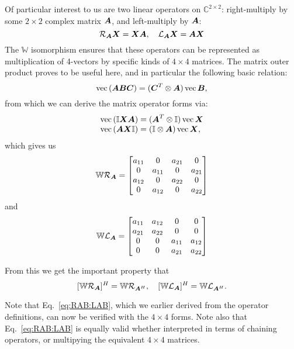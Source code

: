 \documentclass[useAMS,usenatbib]{mn2e}
\makeatletter
\newcommand{\COMPLEX}{\mathbb{C}}
\newcommand{\II}{\mathbb{I}}
\newcommand{\mat}[1]{{\bmath{#1}}}
\newcommand{\Matrix}[2]{\left [ \begin{array}{@{}#1@{}}#2\end{array} \right ]}
\newcommand{\Rop}[1]{\mathcal{R}_{{#1}}}
\newcommand{\Lop}[1]{\mathcal{L}_{{#1}}}
\numberwithin{equation}{section}
\makeatother
\begin{document}
Of particular interest to us are two linear operators on $\COMPLEX^{2\times2}$: 
right-multiply by some $2\times2$ complex matrix $\mat{A}$,  and left-multiply by $\mat{A}$:
\begin{equation}
\Rop{\mat{A}}\mat{X} = \mat{XA}, ~~~
\Lop{\mat{A}}\mat{X} = \mat{AX} 
\end{equation}
The $\mathbb{W}$ isomorphism ensures that these operators can be represented as multiplication of 4-vectors 
by specific kinds of $4\times4$ matrices.  The matrix outer product proves to be useful here, and in particular the following 
basic relation:
\begin{equation}
\VEC(\mat{A}\mat{B}\mat{C}) = (\mat{C}^T \otimes \mat{A})\,\VEC{\mat{B}},
\end{equation}
from which we can derive the matrix operator forms via:
\begin{equation}
\begin{array}{l}
\VEC(\II\mat{X}\mat{A}) = (\mat{A}^T \otimes \II)\,\VEC{\mat{X}}\\
\VEC(\mat{A}\mat{X}\II) = (\II \otimes \mat{A})\,\VEC{\mat{X}},
\end{array}
\end{equation}
which gives us
\begin{equation}
\label{eq:RA4x4}
\WW\Rop{\mat{A}} = 
\Matrix{cccc}{a_{11}&0&a_{21}&0 \\ 0&a_{11}&0&a_{21} \\ a_{12}&0&a_{22}&0  \\ 0&a_{12}&0&a_{22} }
\end{equation}
and
\begin{equation}
\label{eq:LA4x4}
\WW\Lop{\mat{A}} = 
\Matrix{cccc}{a_{11}&a_{12}&0&0 \\ a_{21}&a_{22}&0&0 \\ 0&0&a_{11}&a_{12} \\ 0&0&a_{21}&a_{22} }
\end{equation}

From this we get the important property that
\begin{equation}
\label{eq:RH:LH}
[\WW\Rop{\mat{A}}]^H = \WW\Rop{\mat{A}^H},~~~[\WW\Lop{\mat{A}}]^H = \WW\Lop{\mat{A}^H}.
\end{equation}

Note that Eq.~\ref{eq:RAB:LAB}, which we earlier derived from the operator definitions, can now
be verified with the $4\times4$ forms. Note also that Eq.~\ref{eq:RAB:LAB} is equally valid whether 
interpreted in terms of chaining operators, or multipying the equivalent $4\times4$ matrices.
\end{document}

